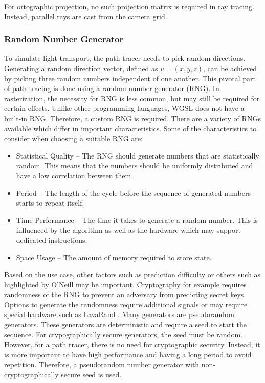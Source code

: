 For ortographic projection, no such projection matrix is required in ray tracing. Instead, parallel rays are cast from the camera grid.

\subsubsection{Random Number Generator}

  
To simulate light transport, the path tracer needs to pick random directions. Generating a random direction vector, defined as $v = (x, y, z)$, can be achieved by picking three random numbers independent of one another. This pivotal part of path tracing is done using a random number generator (\gls{RNG}). In rasterization, the necessity for \gls{RNG} is less common, but may still be required for certain effects. Unlike other programming languages, WGSL does not have a built-in \gls{RNG}. Therefore, a custom \gls{RNG} is required. There are a variety of \gls{RNG}s available which differ in important characteristics. Some of the characteristics to consider when choosing a suitable \gls{RNG} are:

\begin{itemize}
    \item{Statistical Quality} – The \gls{RNG} should generate numbers that are statistically random. This means that the numbers should be uniformly distributed and have a low correlation between them.
    \item{Period} – The length of the cycle before the sequence of generated numbers starts to repeat itself.
    \item{Time Performance} – The time it takes to generate a random number. This is influenced by the algorithm as well as the hardware which may support dedicated instructions.
    \item{Space Usage} – The amount of memory required to store state.
\end{itemize}

Based on the use case, other factors such as prediction difficulty or others such as highlighted by O’Neill \cite{o2014pcg} may be important. Cryptography for example requires randomness of the \gls{RNG} to prevent an adversary from predicting secret keys. Options to generate the randomness require additional signals \cite{randomnessCryptography} or may require special hardware such as LavaRand \cite{cloudflareLavaRand}. Many generators are pseudorandom generators. These generators are deterministic and require a seed to start the sequence. For crypographically secure generators, the seed must be random.
However, for a path tracer, there is no need for cryptographic security. Instead, it is more important to have high performance and having a long period to avoid repetition. Therefore, a pseudorandom number generator with non-cryptographically secure seed is used.

